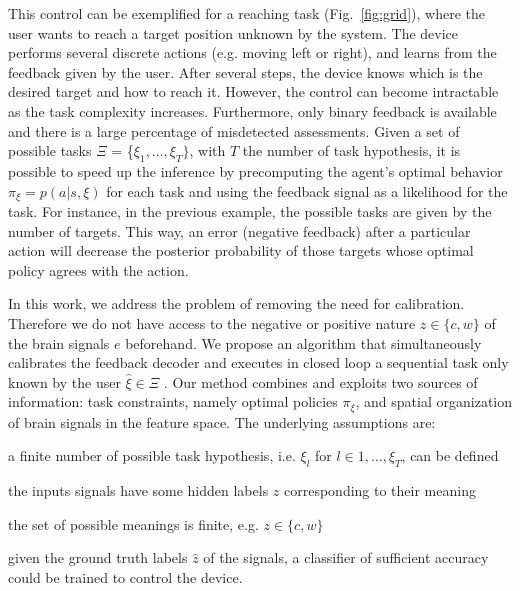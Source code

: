 \documentclass[conference]{IEEEtran}
\begin{document}

This control can be exemplified for a reaching task (Fig.~\ref{fig:grid}), where the user wants to reach a target position unknown by the system. The device performs several discrete actions (e.g. moving left or right), and learns from the feedback given by the user. After several steps, the device knows which is the desired target and how to reach it.
%
However, the control can become intractable as the task complexity increases. Furthermore, only binary feedback is available and there is a large percentage of misdetected assessments. Given a set of possible tasks $\Xi$ = \{$\xi_1, \ldots, \xi_T\}$, with $T$ the number of task hypothesis, it is possible to speed up the inference by precomputing the agent's optimal behavior $\pi_{\xi} = p(a|s,\xi)$ for each task and using the feedback signal as a likelihood for the task.  For instance, in the previous example, the possible tasks are given by the number of targets. This way, an error (negative feedback) after a particular action will decrease the posterior probability of those targets whose optimal policy agrees with the action.

In this work, we address the problem of removing the need for calibration. Therefore we do not have access to the negative or positive nature $z\in\{c,w\}$ of the brain signals $e$ beforehand. We propose an algorithm that simultaneously calibrates the feedback decoder and executes in closed loop a sequential task only known by the user $\hat{\xi} \in \Xi$ . Our method combines and exploits two sources of information: task constraints, namely optimal policies $\pi_{\xi}$, and spatial organization of brain signals in the feature space. The underlying assumptions are: 

\begin{inparaenum}
\item a finite number of possible task hypothesis, i.e. $\xi_l$ for $l \in {1,\ldots,\xi_T}$, can be defined 
\item the inputs signals have some hidden labels $z$ corresponding to their meaning
\item the set of possible meanings is finite, e.g. $z \in \{c, w\}$
\item given the ground truth labels $\hat{z}$ of the signals, a classifier of sufficient accuracy could be trained to control the device.
\end{inparaenum}
\end{document}
